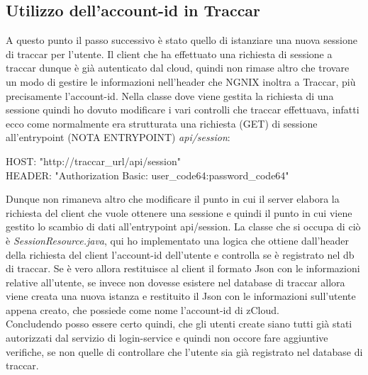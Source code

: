 \documentclass[a4paper,titlepage,12pt]{book}
\begin{document}
\subsection{\sffamily
Utilizzo dell'account-id in Traccar}
A questo punto il passo successivo è stato quello di istanziare una nuova sessione di traccar per l'utente. Il client che ha effettuato una richiesta di sessione a traccar dunque è già autenticato dal cloud, quindi non rimase altro che trovare un modo di gestire le informazioni nell'header che NGNIX  inoltra a Traccar, più precisamente l'account-id. Nella classe dove viene gestita la richiesta di una sessione quindi ho dovuto modificare i vari controlli che traccar effettuava, infatti ecco come normalmente era strutturata una richiesta (GET) di sessione all'entrypoint (NOTA ENTRYPOINT) \textit{api/session}:\par\medskip

\begin{center}\begin{flushleft}
HOST: "http://traccar\_url/api/session"\\
HEADER: "Authorization Basic: user\_code64:password\_code64"\par\medskip
\end{flushleft}

\end{center}

Dunque non rimaneva altro che modificare il punto in cui il server elabora la richiesta del client che vuole ottenere una sessione e quindi il punto in cui viene gestito lo scambio di dati all'entrypoint api/session. La classe che si occupa di ciò è \textit{SessionResource.java}, qui ho implementato una logica che ottiene dall'header della richiesta del client l'account-id dell'utente e controlla se è registrato nel db di traccar. Se è vero allora restituisce al client il formato Json con le informazioni relative all'utente, se invece non dovesse esistere nel database di traccar allora viene creata una nuova istanza e restituito il Json con le informazioni sull'utente appena creato, che possiede come nome l'account-id di zCloud.\\
Concludendo posso essere certo quindi, che gli utenti create siano tutti già stati autorizzati dal servizio di login-service e quindi non occore fare aggiuntive verifiche, se non quelle di controllare che l'utente sia già registrato nel database di traccar.
\end{document}
